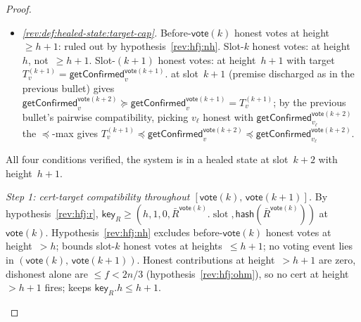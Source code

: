 \ifx\litemode\undefined\documentclass{article}\fi
\newcommand{\slot}[0]{\ensuremath{\operatorname{\mathrm{slot}}}}
\newcommand{\height}{\mathsf{height}}
\newcommand{\hash}{\mathsf{hash}}
\newcommand{\key}{\mathsf{key}}
\newcommand{\vote}{\mathsf{vote}}
\newcommand{\comm}[1]{\bar{#1}}
\newcommand{\getConfirmed}{\textsf{getConfirmed}\xspace}
\theoremstyle{plain}
\theoremstyle{definition}
\theoremstyle{remark}
\begin{document}
\begin{proof}
\begin{description}
\begin{itemize}
  \item \emph{\ref{rev:def:healed-state:target-cap}.}
  Before-$\vote(k)$ honest votes at height~$\geq h+1$: ruled out by hypothesis~\ref{rev:hfj:nh}. Slot-$k$ honest votes: at height~$h$, not~$\geq h+1$. Slot-$(k+1)$ honest votes: at height~$h+1$ with target $T_v^{(k+1)} = \getConfirmed_v^{\vote(k+1)}$.  at slot~$k+1$ (premise discharged as in the previous bullet) gives $\getConfirmed_v^{\vote(k+2)} \succeq \getConfirmed_v^{\vote(k+1)} = T_v^{(k+1)}$; by the previous bullet's pairwise compatibility, picking $v_\ell$ honest with $\getConfirmed_{v_\ell}^{\vote(k+2)}$ the $\preceq$-max gives $T_v^{(k+1)} \preceq \getConfirmed_v^{\vote(k+2)} \preceq \getConfirmed_{v_\ell}^{\vote(k+2)}$.
\end{itemize}
All four conditions verified, the system is in a healed state at slot~$k+2$ with height~$h+1$.


\item[{Case 2: $a^k_v.\height = h+1$ for some honest~$v$.}]\hfill

\emph{Step 1: cert-target compatibility throughout $[\vote(k),\, \vote(k+1)]$.}
By hypothesis~\ref{rev:hfj:r}, $\key_R \geq (h, 1, 0, \comm{R}^{\vote(k)}.\slot, \hash(\comm{R}^{\vote(k)}))$ at $\vote(k)$. Hypothesis~\ref{rev:hfj:nh} excludes before-$\vote(k)$ honest votes at height~$>h$;  bounds slot-$k$ honest votes at heights~$\leq h+1$; no voting event lies in $(\vote(k),\, \vote(k+1))$. Honest contributions at height~$>h+1$ are zero, dishonest alone are $\leq f < 2n/3$ (hypothesis~\ref{rev:hfj:ohm}), so no cert at height~$>h+1$ fires;  keeps $\key_R.h \leq h+1$.


\end{description}
\end{proof}
\end{document}
